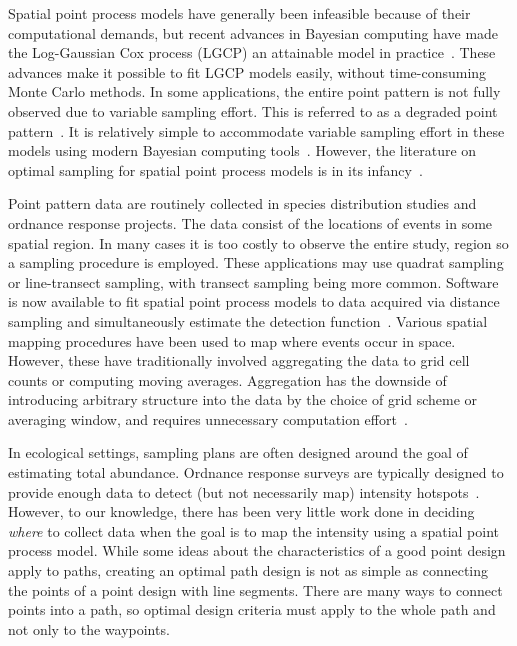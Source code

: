 \documentclass[review]{elsarticle}
\begin{document}
Spatial point process models have generally been infeasible because of their
computational demands, but recent advances in Bayesian computing have made the
Log-Gaussian Cox process (LGCP) an attainable model in
practice~\citep{rueetal, lindgrenetal, illianetal, simpsonetal}. These advances
make it possible to fit LGCP models easily, without time-consuming Monte Carlo
methods. In some applications, the entire point pattern is not fully observed
due to variable sampling effort. This is referred to as a degraded point
pattern~\citep{chakrabortyetal}. It is relatively simple to accommodate
variable sampling effort in these models using modern Bayesian computing
tools~\citep{yuanetal}. However, the literature on optimal sampling for spatial
point process models is in its infancy~\citep{liuvanhatalo}.

Point pattern data are routinely collected in species distribution studies and
ordnance response projects. The data consist of the locations of events in some
spatial region. In many cases it is too costly to observe the entire study,
region so a sampling procedure is employed. These applications may use quadrat
sampling or line-transect sampling, with transect sampling being more common.
Software is now available to fit spatial point process models to data acquired
via distance sampling and simultaneously estimate the detection
function~\citep{dspat,baser}. Various spatial mapping procedures have been used
to map where events occur in space. However, these have traditionally involved
aggregating the data to grid cell counts or computing moving averages.
Aggregation has the downside of introducing arbitrary structure into the data
by the choice of grid scheme or averaging window, and requires unnecessary
computation effort~\citep{simpsonetal}.

In ecological settings, sampling plans are often designed around the goal of
estimating total abundance. Ordnance response surveys are typically designed
to provide enough data to detect (but not necessarily map) intensity
hotspots~\citep{em200-1-15,flaggetal}. However, to our knowledge, there has
been very little work done in deciding \emph{where} to collect data when the
goal is to map the intensity using a spatial point process model. While some
ideas about the characteristics of a good point design apply to paths, creating
an optimal path design is not as simple as connecting the points of a point
design with line segments. There are many ways to connect points into a path,
so optimal design criteria must apply to the whole path and not only to the
waypoints.
\end{document}
